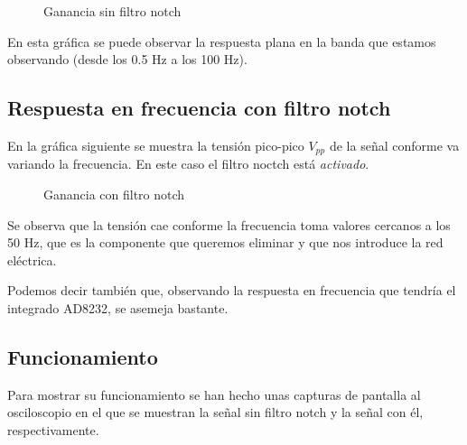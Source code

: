 \documentclass[conference]{IEEEtran}
\begin{document}
\begin{figure}[H]
    \caption{Ganancia sin filtro notch}
    \label{g_sinNotch}
    \end{figure}

En esta gráfica se puede observar la respuesta plana en la banda que estamos observando (desde los 0.5 Hz a los 100 Hz).

\subsection{Respuesta en frecuencia con filtro notch}
En la gráfica siguiente se muestra la tensión pico-pico $V_{pp}$ de la señal conforme va variando la frecuencia. En este caso el filtro noctch está \textit{activado}.
 
\begin{figure}[H]
    \caption{Ganancia con filtro notch}
    \label{g_conNotch}
    \end{figure}

Se observa que la tensión cae conforme la frecuencia toma valores cercanos a los 50 Hz, que es la componente que queremos eliminar y que nos introduce la red eléctrica.

Podemos decir también que, observando la respuesta en frecuencia que tendría el integrado AD8232, se asemeja bastante.

\subsection{Funcionamiento}
Para mostrar su funcionamiento se han hecho unas capturas de pantalla al osciloscopio en el que se muestran la señal sin filtro notch y la señal con él, respectivamente.
\end{document}
